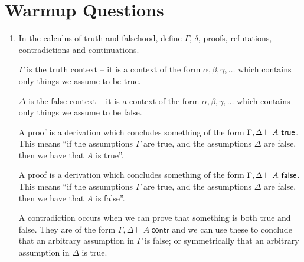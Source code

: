 \documentclass[10pt,\jkfside,a4paper]{article}
\newcommand{\contr}{\ensuremath{\mathsf{contr}}\xspace}
\begin{document}
\section{Warmup Questions}

\begin{enumerate}

    \item In the calculus of truth and falsehood, define $\Gamma$, $\delta$, proofs, refutations, contradictions and continuations.

    \begin{definition}[$\Gamma$]

        $\Gamma$ is the truth context -- it is a context of the form $\alpha, \beta, \gamma, \ldots$ which contains only things we assume to be true.

    \end{definition}

    \begin{definition}[$\Delta$]

        $\Delta$ is the false context -- it is a context of the form $\alpha, \beta, \gamma, \ldots$ which contains only things we assume to be false.

    \end{definition}

    \begin{definition}[Proof]

        A proof is a derivation which concludes something of the form $\Gamma, \Delta \vdash A\ \mathsf{true}$. This means ``if the assumptions $\Gamma$ are true, and the assumptions $\Delta$ are false, then we have that $A$ is true''.

    \end{definition}

    \begin{definition}[Refutation]

        A proof is a derivation which concludes something of the form $\Gamma, \Delta \vdash A\ \mathsf{false}$. This means ``if the assumptions $\Gamma$ are true, and the assumptions $\Delta$ are false, then we have that $A$ is false''.

    \end{definition}

    \begin{definition}[Contradiction]

        A contradiction occurs when we can prove that something is both true and false. They are of the form $\Gamma, \Delta \vdash A\ \contr$ and we can use these to conclude that an arbitrary assumption in $\Gamma$ is false; or symmetrically that an arbitrary assumption in $\Delta$ is true.


\end{definition}
\end{enumerate}
\end{document}
